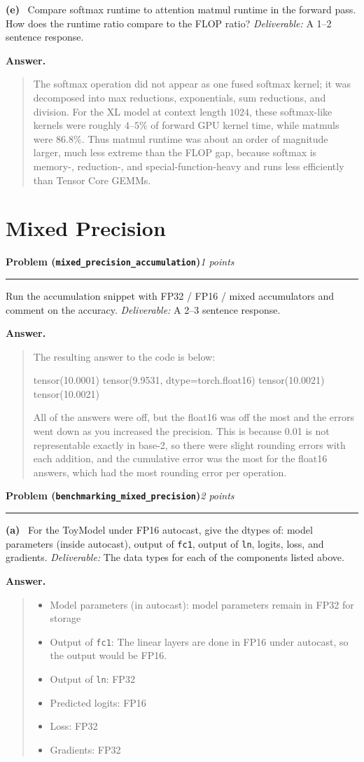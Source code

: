 \documentclass[11pt]{article}
\newcommand{\problem}[2]{%
  \vspace{0.6em}%
  \noindent\textbf{Problem (\texttt{#1})}\hfill\textit{#2 points}\par%
  \vspace{0.2em}\hrule\vspace{0.4em}%
}
\newcommand{\subq}[1]{\vspace{0.3em}\noindent\textbf{(#1)}\ }
\newcommand{\deliverable}[1]{\vspace{0.2em}\noindent\textit{Deliverable:} #1\par}
\newenvironment{answer}{%
  \vspace{0.3em}%
  \noindent\textbf{Answer.}\begin{quote}%
}{%
  \end{quote}\vspace{0.4em}%
}
\begin{document}
\subq{e} Compare softmax runtime to attention matmul runtime in the forward pass. How does the runtime ratio compare to the FLOP ratio?
\deliverable{A 1--2 sentence response.}
\begin{answer}
The softmax operation did not appear as one fused softmax kernel; it was decomposed into max reductions, exponentials, sum reductions, and division.
For the XL model at context length $1024$, these softmax-like kernels were roughly $4$--$5\%$ of forward GPU kernel time, while matmuls were $86.8\%$. Thus matmul runtime was about an order of magnitude larger, much less extreme than the FLOP gap, because softmax is memory-, reduction-, and special-function-heavy and runs less efficiently than Tensor Core GEMMs.
\end{answer}


\section{Mixed Precision}

\problem{mixed\_precision\_accumulation}{1}
Run the accumulation snippet with FP32 / FP16 / mixed accumulators and comment on the accuracy.
\deliverable{A 2--3 sentence response.}
\begin{answer}
  The resulting answer to the code is below:

  tensor(10.0001)
  tensor(9.9531, dtype=torch.float16)
  tensor(10.0021)
  tensor(10.0021)

  All of the answers were off, but the float16 was off the most and the errors went down as you increased the precision.
  This is because 0.01 is not representable exactly in base-2, so there were slight rounding errors with each addition, and 
  the cumulative error was the most for the float16 answers, which had the most rounding error per operation. 
\end{answer}


\problem{benchmarking\_mixed\_precision}{2}

\subq{a} For the ToyModel under FP16 autocast, give the dtypes of: model parameters (inside autocast), output of \texttt{fc1}, output of \texttt{ln}, logits, loss, and gradients.
\deliverable{The data types for each of the components listed above.}
\begin{answer}
\begin{itemize}[leftmargin=*]
  \item Model parameters (in autocast): model parameters remain in FP32 for storage
  \item Output of \texttt{fc1}: The linear layers are done in FP16 under autocast, so the output would be FP16.
  \item Output of \texttt{ln}: FP32
  \item Predicted logits: FP16
  \item Loss: FP32
  \item Gradients: FP32
\end{itemize}
\end{answer}
\end{document}
